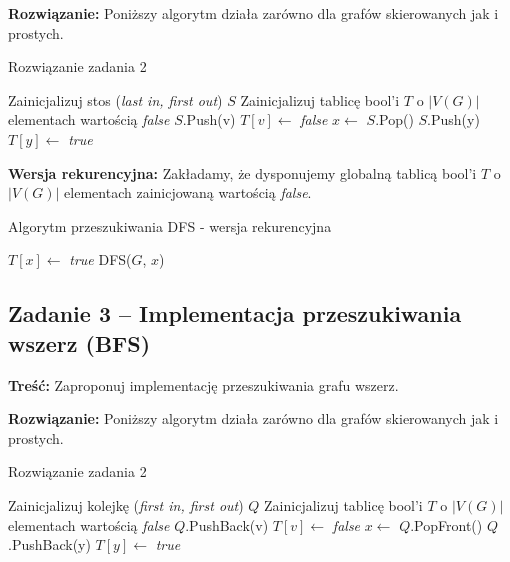 \textbf{Rozwiązanie:}
Poniższy algorytm działa zarówno dla grafów skierowanych
jak i prostych.

\begin{algorithm}[H]
	\caption{Rozwiązanie zadania 2}\label{Zadanie22a}
	\begin{algorithmic}[1]
		\State Zainicjalizuj stos (\textit{last in, first out}) $S$
		\State Zainicjalizuj tablicę bool'i $T$ o $|V(G)|$ elementach wartością 
		\textit{false}
		\State $S$.Push(v)
		\State $T[v] \gets$ \textit{false}
		\State $x \gets$ $S$.Pop()
		\State $S$.Push(y)
		\State $T[y] \gets$ \textit{true} 
		\EndIf
		\EndWhile
		\EndWhile
		\EndProcedure
	\end{algorithmic}
\end{algorithm}

\textbf{Wersja rekurencyjna:} Zakładamy, że dysponujemy globalną
tablicą bool'i $T$ o $|V(G)|$ elementach zainicjowaną wartością 
\textit{false}.

\begin{algorithm}[H]
	\caption{Algorytm przeszukiwania DFS - wersja rekurencyjna}\label{Zadanie22b}
	\begin{algorithmic}[1]
		\State $T[x] \gets$ \textit{true}
		\State DFS($G$, $x$)
		\EndIf
		\EndWhile
		\EndProcedure
	\end{algorithmic}
\end{algorithm}

\subsection{Zadanie 3 -- Implementacja przeszukiwania wszerz (BFS)}

\textbf{Treść: } Zaproponuj implementację
przeszukiwania grafu wszerz.

\textbf{Rozwiązanie:}
Poniższy algorytm działa zarówno dla grafów skierowanych
jak i prostych.

\begin{algorithm}[H]
	\caption{Rozwiązanie zadania 2}\label{Zadanie23}
	\begin{algorithmic}[1]
		\State Zainicjalizuj kolejkę (\textit{first in, first out}) $Q$
		\State Zainicjalizuj tablicę bool'i $T$ o $|V(G)|$ elementach wartością 
		\textit{false}
		\State $Q$.PushBack(v)
		\State $T[v] \gets$ \textit{false}
		\State $x \gets$ $Q$.PopFront()
		\State $Q$.PushBack(y)
		\State $T[y] \gets$ \textit{true} 
		\EndIf
		\EndWhile
		\EndWhile
		\EndProcedure
	\end{algorithmic}
\end{algorithm}

